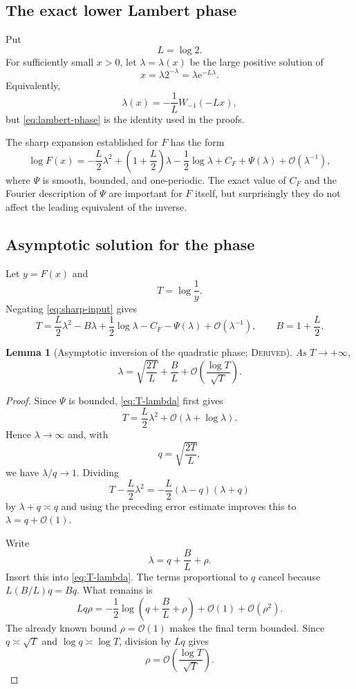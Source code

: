 \documentclass[11pt,oneside]{article}
\newtheorem{lemma}[theorem]{Lemma}
\theoremstyle{definition}
\theoremstyle{remark}
\newcommand{\e}{\mathrm e}
\newcommand{\bigO}{\mathcal O}
\newcommand{\Derived}{\textsc{Derived}}
\begin{document}
\subsection{The exact lower Lambert phase}

Put
\[
 L=\log2.
\]
For sufficiently small $x>0$, let $\lambda=\lambda(x)$ be the large
positive solution of
\begin{equation}
 x=\lambda2^{-\lambda}
   =\lambda\e^{-L\lambda}. \label{eq:lambert-phase}
\end{equation}
Equivalently,
\[
 \lambda(x)=-\frac1L W_{-1}(-Lx),
\]
but \eqref{eq:lambert-phase} is the identity used in the proofs.

The sharp expansion established for $F$ has the form
\begin{equation}
 \log F(x)
 =-\frac L2\lambda^2+
   \left(1+\frac L2\right)\lambda
   -\frac12\log\lambda
   +C_F+\Psi(\lambda)
   +\bigO(\lambda^{-1}), \label{eq:sharp-input}
\end{equation}
where $\Psi$ is smooth, bounded, and one-periodic.  The exact value of
$C_F$ and the Fourier description of $\Psi$ are important for $F$ itself,
but surprisingly they do not affect the leading equivalent of the
inverse.

\subsection{Asymptotic solution for the phase}

Let $y=F(x)$ and
\[
 T=\log\frac1y.
\]
Negating \eqref{eq:sharp-input} gives
\begin{equation}
 T=\frac L2\lambda^2-B\lambda+\frac12\log\lambda
     -C_F-\Psi(\lambda)+\bigO(\lambda^{-1}),
 \qquad B=1+\frac L2. \label{eq:T-lambda}
\end{equation}

\begin{lemma}[Asymptotic inversion of the quadratic phase; \Derived]
\label{lem:lambda-from-T}
As $T\to+\infty$,
\[
 \lambda
 =\sqrt{\frac{2T}{L}}+\frac BL
   +\bigO\!\left(\frac{\log T}{\sqrt T}\right).
\]
\end{lemma}

\begin{proof}
Since $\Psi$ is bounded, \eqref{eq:T-lambda} first gives
\[
 T=\frac L2\lambda^2+\bigO(\lambda+\log\lambda).
\]
Hence $\lambda\to\infty$ and, with
\[
 q=\sqrt{\frac{2T}{L}},
\]
we have $\lambda/q\to1$.  Dividing
\[
 T-\frac L2\lambda^2
 =-\frac L2(\lambda-q)(\lambda+q)
\]
by $\lambda+q\asymp q$ and using the preceding error estimate improves
this to $\lambda=q+\bigO(1)$.

Write
\[
 \lambda=q+\frac BL+\rho.
\]
Insert this into \eqref{eq:T-lambda}.  The terms proportional to $q$
cancel because $L(B/L)q=Bq$.  What remains is
\[
 Lq\rho
 =-\frac12\log\!\left(q+\frac BL+\rho\right)+\bigO(1)
   +\bigO(\rho^2).
\]
The already known bound $\rho=\bigO(1)$ makes the final term bounded.
Since $q\asymp\sqrt T$ and $\log q\asymp\log T$, division by $Lq$ gives
\[
 \rho=\bigO\!\left(\frac{\log T}{\sqrt T}\right).
\]
\end{proof}
\end{document}
